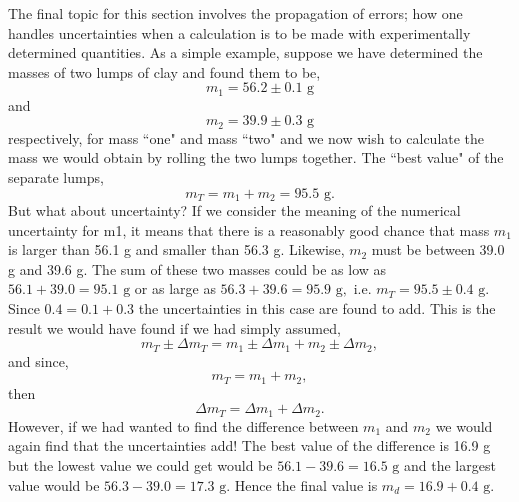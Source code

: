 \documentclass[main.tex]{subfiles}
\begin{document}
The final topic for this section involves the propagation of errors; how one handles uncertainties when a calculation is to be made with experimentally determined quantities.  As a simple example, suppose we have determined the masses of two lumps of clay and found them to be,
\[
m_1 = 56.2 \pm 0.1 \text{ g}
\]
and
\[
m_2 = 39.9 \pm 0.3 \text{ g}
\]
respectively, for mass ``one" and mass ``two" and we now wish to calculate the mass we would obtain by rolling the two lumps together.  The ``best value" of  the separate  lumps,
\[
m_T=m_1+m_2 = 95.5\text{ g}.
\]
But what about uncertainty?  If we consider the meaning of the numerical uncertainty for m1, it means that there is a reasonably good chance that mass $m_1$ is larger than 56.1 g and smaller than 56.3 g.  Likewise, $m_2$ must be between 39.0 g and 39.6 g.  The sum of these two masses could be as low as $56.1 + 39.0 = 95.1\text{ g}$ or as large as $56.3 + 39.6 = 95.9\text{ g},$ i.e. $m_T = 95.5 \pm 0.4\text{ g}.$  Since $0.4 = 0.1 + 0.3$ the uncertainties in this case are found to add.  This is the result we would have found if we had simply assumed,
\[
m_T \pm \Delta m_T = m_1 \pm \Delta m_1 + m_2 \pm \Delta m_2,
\]
and since,
\[
m_T=m_1+m_2,
\]
then
\[
\Delta m_T= \Delta m_1 + \Delta m_2.
\]
However, if we had wanted to find the difference between $m_1$  and $m_2$ we would again find that the uncertainties add!  The best value of the difference is 16.9 g but the lowest value we could get would be $56.1 - 39.6 = 16.5\text{ g}$ and the largest value would be $56.3 - 39.0 = 17.3\text{ g}.$  Hence the final value is $m_d = 16.9 + 0.4\text{ g}.$
\end{document}
